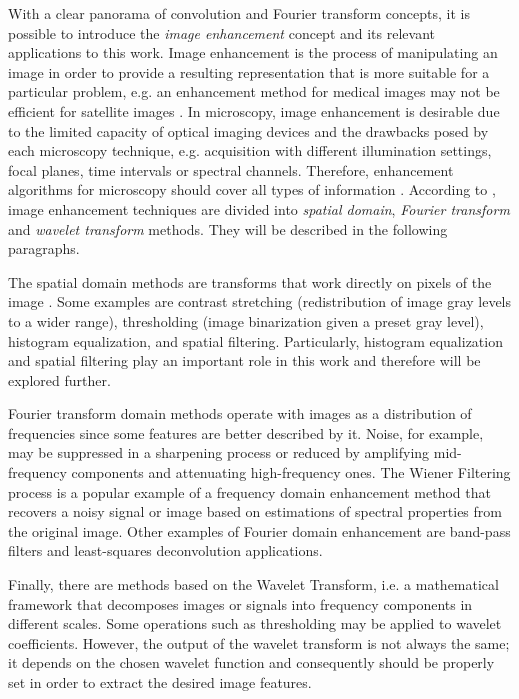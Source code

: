 With a clear panorama of convolution and Fourier transform concepts, it is possible to introduce the \emph{image enhancement} concept and its relevant applications to this work. Image enhancement is the process of manipulating an image in order to provide a resulting representation that is more suitable for a particular problem, e.g. an enhancement method for medical images may not be efficient for satellite images \cite{gonzalez2018digital}. In microscopy, image enhancement is desirable due to the limited capacity of optical imaging devices and the drawbacks posed by each microscopy technique, e.g. acquisition with different illumination settings, focal planes, time intervals or spectral channels. Therefore, enhancement algorithms for microscopy should cover all types of information \cite{wu2008microscope}. According to , image enhancement techniques are divided into \emph{spatial domain}, \emph{Fourier transform} and \emph{wavelet transform} methods. They will be described in the following paragraphs. 

The spatial domain methods are transforms that work directly on pixels of the image \cite{gonzalez2018digital}. Some examples are contrast stretching (redistribution of image gray levels to a wider range), thresholding (image binarization given a preset gray level), histogram equalization, and spatial filtering. Particularly, histogram equalization and spatial filtering play an important role in this work and therefore will be explored further.

Fourier transform domain methods operate with images as a distribution of frequencies since some features are better described by it. Noise, for example, may be suppressed in a sharpening process or reduced by amplifying mid-frequency components and attenuating high-frequency ones. The Wiener Filtering process is a popular example of a frequency domain enhancement method that recovers a noisy signal or image based on estimations of spectral properties from the original image. Other examples of Fourier domain enhancement are band-pass filters and least-squares deconvolution applications. 

Finally, there are methods based on the Wavelet Transform, i.e. a mathematical framework that decomposes images or signals into frequency components in different scales. Some operations such as thresholding may be applied to wavelet coefficients. However, the output of the wavelet transform is not always the same; it depends on the chosen wavelet function and consequently should be properly set in order to extract the desired image features.

